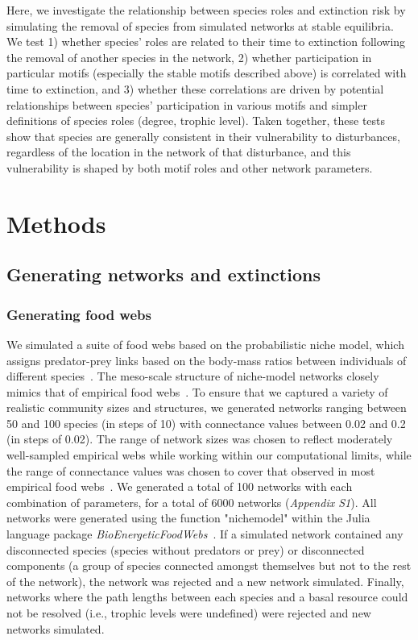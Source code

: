 \documentclass[12pt]{article}
\begin{document}
\begin{spacing}{2.0}
    
    Here, we investigate the relationship between species roles and extinction risk by simulating the removal of species from simulated networks at stable equilibria. We test 1) whether species' roles are related to their time to extinction following the removal of another species in the network, 2) whether participation in particular motifs (especially the stable motifs described above) is correlated with time to extinction, and 3) whether these correlations are driven by potential relationships between species' participation in various motifs and simpler definitions of species roles (degree, trophic level). Taken together, these tests show that species are generally consistent in their vulnerability to disturbances, regardless of the location in the network of that disturbance, and this vulnerability is shaped by both motif roles and other network parameters.


\section*{Methods}

    \subsection*{Generating networks and extinctions}

    	\subsubsection*{Generating food webs}
    
    		We simulated a suite of food webs based on the probabilistic niche model, which assigns predator-prey links based on the body-mass ratios between individuals of different species~\citep{Williams2000,Delmas2017}. The meso-scale structure of niche-model networks closely mimics that of empirical food webs~\citep{Stouffer2007}. To ensure that we captured a variety of realistic community sizes and structures, we generated networks ranging between 50 and 100 species (in steps of 10) with connectance values between 0.02 and 0.2 (in steps of 0.02). The range of network sizes was chosen to reflect moderately well-sampled empirical webs while working within our computational limits, while the range of connectance values was chosen to cover that observed in most empirical food webs~\citep{Dunne2002}. We generated a total of 100 networks with each combination of parameters, for a total of 6000 networks (\emph{Appendix S1}). All networks were generated using the function "nichemodel" within the Julia language package \emph{BioEnergeticFoodWebs}~\citep{bioenergeticfw,Delmas2017}. If a simulated network contained any disconnected species (species without predators or prey) or disconnected components (a group of species connected amongst themselves but not to the rest of the network), the network was rejected and a new network simulated. Finally, networks where the path lengths between each species and a basal resource could not be resolved (i.e., trophic levels were undefined) were rejected and new networks simulated.
    

\end{spacing}
\end{document}

